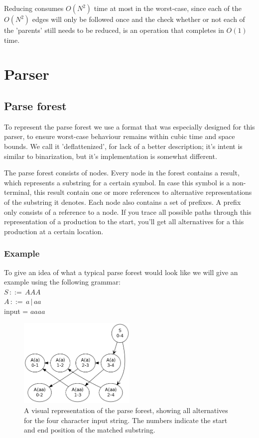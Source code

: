\documentclass[a4paper,10pt]{article}
\begin{document}
Reducing consumes $O(N^2)$ time at most in the worst-case, since each of the $O(N^2)$ edges will only be followed once and the check whether or not each of the 'parents' still needs to be reduced, is an operation that completes in $O(1)$ time.

\section{Parser}

\subsection{Parse forest}

To represent the parse forest we use a format that was especially designed for this parser, to ensure worst-case behaviour remains within cubic time and space bounds. We call it 'deflattenized', for lack of a better description; it's intent is similar to binarization, but it's implementation is somewhat different.

The parse forest consists of nodes. Every node in the forest contains a result, which represents a substring for a certain symbol. In case this symbol is a non-terminal, this result contain one or more references to alternative representations of the substring it denotes. Each node also contains a set of prefixes. A prefix only consists of a reference to a node. If you trace all possible paths through this representation of a production to the start, you'll get all alternatives for a this production at a certain location.

\subsubsection{Example}
To give an idea of what a typical parse forest would look like we will give an example using the following grammar:\\
$S\,::=\,AAA$\\
$A\,::=\,a\,|\,aa$\\
input = $aaaa$

\begin{figure}[H]
\centering
\includegraphics[width=0.5\textwidth]{a_aa-forest.png}
\caption{A visual representation of the parse forest, showing all alternatives for the four character input string. The numbers indicate the start and end position of the matched substring.}
\end{figure}
\end{document}
